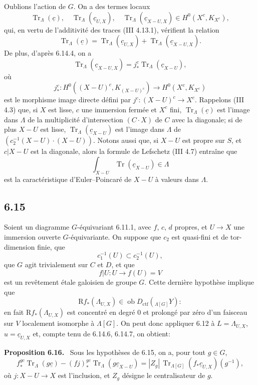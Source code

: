 \documentclass[11pt]{article}
\newenvironment{statement}[1]{\par\medskip\noindent\textbf{#1.}\ }{\par\medskip}
\newcommand{\R}{\mathrm{R}}\newcommand{\RHomCore}{\mathrm{RHom}}
\providecommand{\Tr}{\operatorname{Tr}}
\providecommand{\Tr}{\operatorname{Tr}}
\providecommand{\Ob}{\operatorname{ob}}
\providecommand{\Tr}{\operatorname{Tr}}
\providecommand{\Ob}{\operatorname{ob}}
\providecommand{\R}{\mathrm R}
\providecommand{\Tr}{\operatorname{Tr}}
\providecommand{\Ob}{\operatorname{Ob}}
\providecommand{\Tr}{\operatorname{Tr}}
\providecommand{\Ob}{\operatorname{ob}}
\providecommand{\Ob}{\operatorname{Ob}}
\begin{document}
Oublions l'action de $G$. On a des termes locaux
\begin{equation}
\Tr_{\Lambda}(\underline c),\quad
\Tr_{\Lambda}(\underline c_{U,X}),\quad
\Tr_{\Lambda}(\underline c_{X-U,X})
\in H^0(X^c,K_{X^c}),
\tag{6.14.5}
\end{equation}
qui, en vertu de l'additivité des traces (III 4.13.1), vérifient la relation
\begin{equation}
\Tr_{\Lambda}(\underline c)
=
\Tr_{\Lambda}(\underline c_{U,X})
+
\Tr_{\Lambda}(\underline c_{X-U,X}).
\tag{6.14.6}
\end{equation}
De plus, d'après 6.14.4, on a
\begin{equation}
\Tr_{\Lambda}(\underline c_{X-U,X})
=
j_*^c\Tr_{\Lambda}(\underline c_{X-U}),
\tag{6.14.7}
\end{equation}
où
\[
j_*^c:H^0((X-U)^c,K_{(X-U)^c})\longrightarrow H^0(X^c,K_{X^c})
\]
est le morphisme image directe défini par $j^c:(X-U)^c\to X^c$. Rappelons (III 4.3) que, si $X$ est lisse, $c$ une immersion fermée et $X^c$ fini, $\Tr_{\Lambda}(\underline c)$ est l'image dans $\Lambda$ de la multiplicité d'intersection $(C\cdot X)$ de $C$ avec la diagonale; si de plus $X-U$ est lisse, $\Tr_{\Lambda}(\underline c_{X-U})$ est l'image dans $\Lambda$ de $(c_2^{-1}(X-U)\cdot(X-U))$. Notons aussi que, si $X-U$ est propre sur $S$, et $c|X-U$ est la diagonale, alors la formule de Lefschetz (III 4.7) entraîne que
\[
\int_{X-U}\Tr(\underline c_{X-U})\in\Lambda
\]
est la caractéristique d'Euler--Poincaré de $X-U$ à valeurs dans $\Lambda$.

\subsection*{6.15}
Soient un diagramme $G$-équivariant 6.11.1, avec $f$, $c$, $d$ propres, et $U\to X$ une immersion ouverte $G$-équivariante. On suppose que $c_2$ est quasi-fini et de tor-dimension finie, que
\[
c_1^{-1}(U)\subset c_2^{-1}(U),
\]
que $G$ agit trivialement sur $C$ et $D$, et que
\[
f|U:U\longrightarrow f(U)=V
\]
est un revêtement étale galoisien de groupe $G$. Cette dernière hypothèse implique que
\[
\R f_*(\Lambda_{U,X})\in\Ob D_{\mathrm{ctf}}({}_{\Lambda[G]}Y):
\]
en fait $\R f_*(\Lambda_{U,X})$ est concentré en degré $0$ et prolongé par zéro d'un faisceau sur $V$ localement isomorphe à $\Lambda[G]$. On peut donc appliquer 6.12 à $L=\Lambda_{U,X}$, $u=\underline c_{U,X}$ et, compte tenu de 6.14.6, 6.14.7, on obtient:

\begin{statement}{Proposition 6.16}
Sous les hypothèses de 6.15, on a, pour tout $g\in G$,
\begin{equation}
f_*^{gc}\Tr_{\Lambda}(g\underline c)
-(fj)_*^{gc}\Tr_{\Lambda}(g\underline c_{X-U})
=
|Z_g|\,\Tr_{\Lambda[G]}(f_*\underline c_{U,X})(g^{-1}),
\tag{6.16.1}
\end{equation}
où $j:X-U\to X$ est l'inclusion, et $Z_g$ désigne le centralisateur de $g$.
\end{statement}
\end{document}
